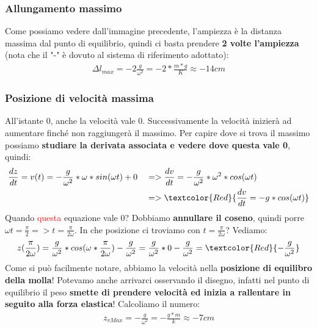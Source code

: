         \subsubsection{Allungamento massimo}
            Come possiamo vedere dall'immagine precedente, l'ampiezza è la distanza massima dal punto di equilibrio, quindi ci basta prendere \textbf{2 volte l'ampiezza} (nota che il "-" è dovuto al sistema di riferimento adottato):
            \begin{align*}
                \Delta l_{max}=-2\frac{g}{\omega^2}=-2*\frac{m*g}{K}\approx-14cm
            \end{align*}

        \subsubsection{Posizione di velocità massima}
            All'istante 0, anche la velocità vale 0. Successivamente la velocità inizierà ad aumentare finché non raggiungerà il massimo. Per capire dove si trova il massimo possiamo \textbf{studiare la derivata associata e vedere dove questa vale 0}, quindi:
            \begin{align*}
                &\frac{dz}{dt}=v(t)=-\frac{g}{\omega^2}*\omega*sin(\omega t)+ 0 &&=>\frac{dv}{dt}=-\frac{g}{\omega^2}*\omega^2*cos(\omega t)\\
                & &&=>\textcolor{Red}{\frac{dv}{dt}=-g*cos(\omega t)}
            \end{align*}
            Quando \textcolor{Red}{questa} equazione vale 0? Dobbiamo \textbf{annullare il coseno}, quindi porre $\omega t = \frac{\pi}{2}=>t=\frac{\pi}{2\omega}$. In che posizione ci troviamo con $t=\frac{\pi}{2\omega}$? Vediamo:
            \begin{align*}
                z(\frac{\pi}{2\omega})=\frac{g}{\omega^2}*cos(\omega * \frac{\pi}{2\omega})-\frac{g}{\omega^2} = \frac{g}{\omega^2}*0-\frac{g}{\omega^2} = \textcolor{Red}{-\frac{g}{\omega^2}}
            \end{align*}
            Come si può facilmente notare, abbiamo la velocità nella \textbf{posizione di equilibro della molla}! Potevamo anche arrivarci osservando il disegno, infatti nel punto di equilibrio il peso \textbf{smette di prendere velocità ed inizia a rallentare in seguito alla forza elastica}! Calcoliamo il numero:
            \begin{align*}
                z_{vMax}=-\frac{g}{\omega^2} = -\frac{g*m}{k}\approx -7cm
            \end{align*}

